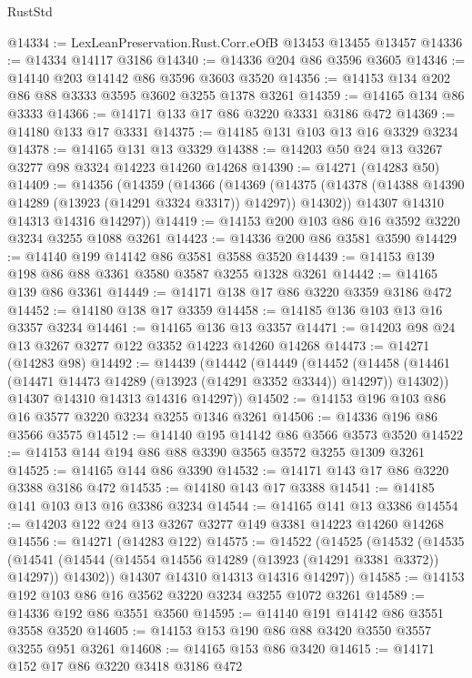 \begin{lexlean}{RustStd}
\begin{coremodule}
{\begin{coremodule}
{{{{{{{{{{{{{{{{{{{{{{{{{{{{{{{{{{{{{@14334 := LexLeanPreservation.Rust.Corr.eOfB @13453 @13455 @13457
@14336 := @14334 @14117 @3186
@14340 := @14336 @204 @86 @3596 @3605
@14346 := @14140 @203 @14142 @86 @3596 @3603 @3520
@14356 := @14153 @134 @202 @86 @88 @3333 @3595 @3602 @3255 @1378 @3261
@14359 := @14165 @134 @86 @3333
@14366 := @14171 @133 @17 @86 @3220 @3331 @3186 @472
@14369 := @14180 @133 @17 @3331
@14375 := @14185 @131 @103 @13 @16 @3329 @3234
@14378 := @14165 @131 @13 @3329
@14388 := @14203 @50 @24 @13 @3267 @3277 @98 @3324 @14223 @14260 @14268
@14390 := @14271 (@14283 @50)
@14409 := @14356
    (@14359
      (@14366
        (@14369
          (@14375 (@14378 (@14388 @14390 @14289 (@13923 (@14291 @3324 @3317)) @14297)) @14302))
        @14307
        @14310
        @14313
        @14316
        @14297))
@14419 := @14153 @200 @103 @86 @16 @3592 @3220 @3234 @3255 @1088 @3261
@14423 := @14336 @200 @86 @3581 @3590
@14429 := @14140 @199 @14142 @86 @3581 @3588 @3520
@14439 := @14153 @139 @198 @86 @88 @3361 @3580 @3587 @3255 @1328 @3261
@14442 := @14165 @139 @86 @3361
@14449 := @14171 @138 @17 @86 @3220 @3359 @3186 @472
@14452 := @14180 @138 @17 @3359
@14458 := @14185 @136 @103 @13 @16 @3357 @3234
@14461 := @14165 @136 @13 @3357
@14471 := @14203 @98 @24 @13 @3267 @3277 @122 @3352 @14223 @14260 @14268
@14473 := @14271 (@14283 @98)
@14492 := @14439
    (@14442
      (@14449
        (@14452
          (@14458 (@14461 (@14471 @14473 @14289 (@13923 (@14291 @3352 @3344)) @14297)) @14302))
        @14307
        @14310
        @14313
        @14316
        @14297))
@14502 := @14153 @196 @103 @86 @16 @3577 @3220 @3234 @3255 @1346 @3261
@14506 := @14336 @196 @86 @3566 @3575
@14512 := @14140 @195 @14142 @86 @3566 @3573 @3520
@14522 := @14153 @144 @194 @86 @88 @3390 @3565 @3572 @3255 @1309 @3261
@14525 := @14165 @144 @86 @3390
@14532 := @14171 @143 @17 @86 @3220 @3388 @3186 @472
@14535 := @14180 @143 @17 @3388
@14541 := @14185 @141 @103 @13 @16 @3386 @3234
@14544 := @14165 @141 @13 @3386
@14554 := @14203 @122 @24 @13 @3267 @3277 @149 @3381 @14223 @14260 @14268
@14556 := @14271 (@14283 @122)
@14575 := @14522
    (@14525
      (@14532
        (@14535
          (@14541 (@14544 (@14554 @14556 @14289 (@13923 (@14291 @3381 @3372)) @14297)) @14302))
        @14307
        @14310
        @14313
        @14316
        @14297))
@14585 := @14153 @192 @103 @86 @16 @3562 @3220 @3234 @3255 @1072 @3261
@14589 := @14336 @192 @86 @3551 @3560
@14595 := @14140 @191 @14142 @86 @3551 @3558 @3520
@14605 := @14153 @153 @190 @86 @88 @3420 @3550 @3557 @3255 @951 @3261
@14608 := @14165 @153 @86 @3420
@14615 := @14171 @152 @17 @86 @3220 @3418 @3186 @472
}}}}}}}}}}}}}}}}}}}}}}}}}}}}}}}}}}}}}
\end{coremodule}}
\end{coremodule}
\end{lexlean}
